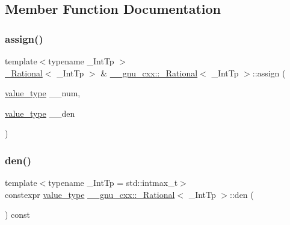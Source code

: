 \subsection{Member Function Documentation}
\mbox{\label{class____gnu__cxx_1_1__Rational_a0e10e52021e698f2d8e44fb900441e50}} 
\subsubsection{\texorpdfstring{assign()}{assign()}}
{\footnotesize\ttfamily template$<$typename \+\_\+\+Int\+Tp $>$ \\
\hyperlink{class____gnu__cxx_1_1__Rational}{\+\_\+\+Rational}$<$ \+\_\+\+Int\+Tp $>$ \& \hyperlink{class____gnu__cxx_1_1__Rational}{\+\_\+\+\_\+gnu\+\_\+cxx\+::\+\_\+\+Rational}$<$ \+\_\+\+Int\+Tp $>$\+::assign (\begin{DoxyParamCaption}\item[{\hyperlink{class____gnu__cxx_1_1__Rational_a7987be70fc59d0d980621fd65828b74a}{value\+\_\+type}}]{\+\_\+\+\_\+num,  }\item[{\hyperlink{class____gnu__cxx_1_1__Rational_a7987be70fc59d0d980621fd65828b74a}{value\+\_\+type}}]{\+\_\+\+\_\+den }\end{DoxyParamCaption})\hspace{0.3cm}{\ttfamily [inline]}}

\mbox{\label{class____gnu__cxx_1_1__Rational_ad81cb4cc41bd07dca0588f0ca73a1f34}} 
\subsubsection{\texorpdfstring{den()}{den()}}
{\footnotesize\ttfamily template$<$typename \+\_\+\+Int\+Tp = std\+::intmax\+\_\+t$>$ \\
constexpr \hyperlink{class____gnu__cxx_1_1__Rational_a7987be70fc59d0d980621fd65828b74a}{value\+\_\+type} \hyperlink{class____gnu__cxx_1_1__Rational}{\+\_\+\+\_\+gnu\+\_\+cxx\+::\+\_\+\+Rational}$<$ \+\_\+\+Int\+Tp $>$\+::den (\begin{DoxyParamCaption}{ }\end{DoxyParamCaption}) const\hspace{0.3cm}{\ttfamily [inline]}}

